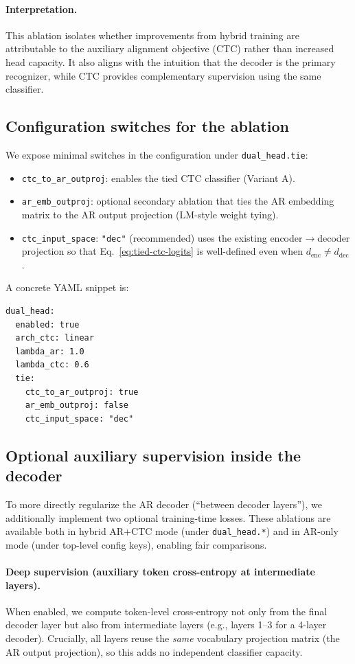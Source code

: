 \paragraph{Interpretation.}
This ablation isolates whether improvements from hybrid training are attributable to the auxiliary alignment objective (CTC) rather than increased head capacity.
It also aligns with the intuition that the decoder is the primary recognizer, while CTC provides complementary supervision using the same classifier.

\subsection{Configuration switches for the ablation}
We expose minimal switches in the configuration under \texttt{dual\_head.tie}:
\begin{itemize}
  \item \texttt{ctc\_to\_ar\_outproj}: enables the tied CTC classifier (Variant A).
  \item \texttt{ar\_emb\_outproj}: optional secondary ablation that ties the AR embedding matrix to the AR output projection (LM-style weight tying).
  \item \texttt{ctc\_input\_space}: \texttt{"dec"} (recommended) uses the existing encoder$\to$decoder projection so that Eq.~\eqref{eq:tied-ctc-logits} is well-defined even when $d_{\text{enc}}\ne d_{\text{dec}}$.
\end{itemize}
A concrete YAML snippet is:
\begin{verbatim}
dual_head:
  enabled: true
  arch_ctc: linear
  lambda_ar: 1.0
  lambda_ctc: 0.6
  tie:
    ctc_to_ar_outproj: true
    ar_emb_outproj: false
    ctc_input_space: "dec"
\end{verbatim}

\subsection{Optional auxiliary supervision inside the decoder}
\label{sec:decoder-aux-supervision}
To more directly regularize the AR decoder (``between decoder layers''), we additionally implement two optional training-time losses.
These ablations are available both in hybrid AR+CTC mode (under \texttt{dual\_head.*}) and in AR-only mode (under top-level config keys), enabling fair comparisons.

\paragraph{Deep supervision (auxiliary token cross-entropy at intermediate layers).}
When enabled, we compute token-level cross-entropy not only from the final decoder layer but also from intermediate layers (e.g., layers 1--3 for a 4-layer decoder).
Crucially, all layers reuse the \emph{same} vocabulary projection matrix (the AR output projection), so this adds no independent classifier capacity.

